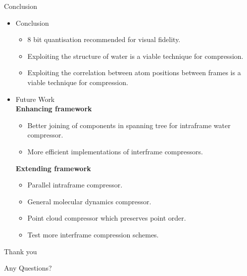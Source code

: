 \documentclass{beamer}
\begin{document}
\begin{frame}{Conclusion}
\begin{itemize}
 \item Conclusion
 \begin{itemize}
 \item 8 bit quantisation recommended for visual fidelity.
 \item Exploiting the structure of water is a viable technique for compression.
 \item Exploiting the correlation between atom positions between frames is a viable technique for compression.
\end{itemize}
 \item Future Work \\ \textbf{Enhancing framework}
  \begin{itemize}
  
  \item Better joining of components in spanning tree for intraframe water
    compressor.
  \item More efficient implementations of interframe compressors.
  \end{itemize}
  \textbf{Extending framework}
  \begin{itemize}
  \item Parallel intraframe compressor.
  \item General molecular dynamics compressor.
  \item Point cloud compressor which preserves point order.
  \item Test more interframe compression schemes.
  \end{itemize}
\end{itemize}


\end{frame}


\begin{frame}{Thank you}
  \begin{center}
    Any Questions?
  \end{center}
\end{frame}
\end{document}
